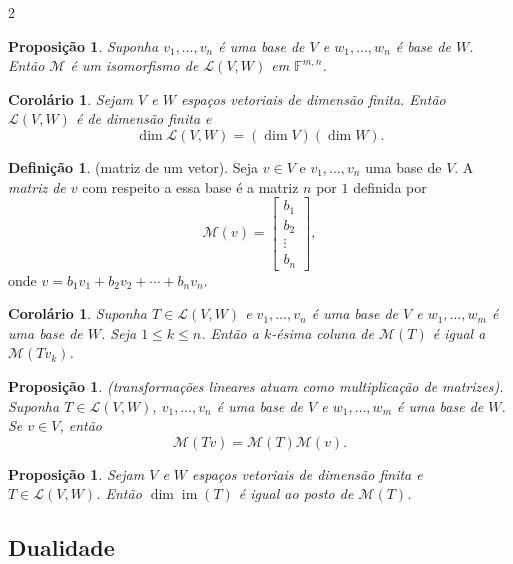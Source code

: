 \documentclass{article}
\theoremstyle{plain}
\newtheorem{prop}[thm]{Proposição}
\newtheorem{cor}[thm]{Corolário}
\theoremstyle{definition}
\newtheorem{defn}{Definição}[section]
\theoremstyle{remark}
\DeclareMathOperator{\im}{im}
\begin{document}
\begin{multicols}{2}
\begin{prop}
    Suponha \(v_1, \ldots, v_n\) é uma base de \(V\) e \(w_1, \ldots, w_n\) é base de \(W\). Então \(\mathcal{M}\) é um isomorfismo de \(\mathcal{L}(V, W)\) em \(\mathbb{F}^{m,n}\).
\end{prop}

\begin{cor}
    Sejam \(V\) e \(W\) espaços vetoriais de dimensão finita. Então \(\mathcal{L}(V, W)\) é de dimensão finita e
    \[
        \dim \mathcal{L}(V, W) = (\dim V)(\dim W).
    \]
\end{cor}

\begin{defn} (matriz de um vetor).
    Seja \(v \in V\) e \(v_1,\ldots,v_n\) uma base de \(V\). A \emph{matriz de \(v\)} com respeito a essa base é a matriz \(n\) por \(1\) definida por
    \[
        \mathcal{M}(v) = \begin{bmatrix}
            b_1 \\
            b_2 \\
            \vdots \\
            b_n
        \end{bmatrix},
    \]
    \noindent onde \(v = b_1 v_1 + b_2 v_2 + \cdots + b_n v_n\).
\end{defn}

\begin{cor}
    Suponha \(T \in \mathcal{L}(V, W)\) e \(v_1,\ldots,v_n\) é uma base de \(V\) e \(w_1,\ldots,w_m\) é uma base de \(W\). Seja \(1 \leq k \leq n\). Então a \(k\)-ésima coluna de \(\mathcal{M}(T)\) é igual a \(\mathcal{M}(Tv_k)\).
\end{cor}

\begin{prop} (transformações lineares atuam como multiplicação de matrizes).
    Suponha \(T \in \mathcal{L}(V, W)\), \(v_1,\ldots,v_n\) é uma base de \(V\) e \(w_1,\ldots,w_m\) é uma base de \(W\). Se \(v \in V\), então
    \[
        \mathcal{M}(Tv) = \mathcal{M}(T) \mathcal{M}(v).
    \]
\end{prop}

\begin{prop}
    Sejam \(V\) e \(W\) espaços vetoriais de dimensão finita e \(T \in \mathcal{L}(V, W)\). Então \(\dim \im(T)\) é igual ao posto de \(\mathcal{M}(T)\).
\end{prop}

\subsection{Dualidade}


\end{multicols}
\end{document}
